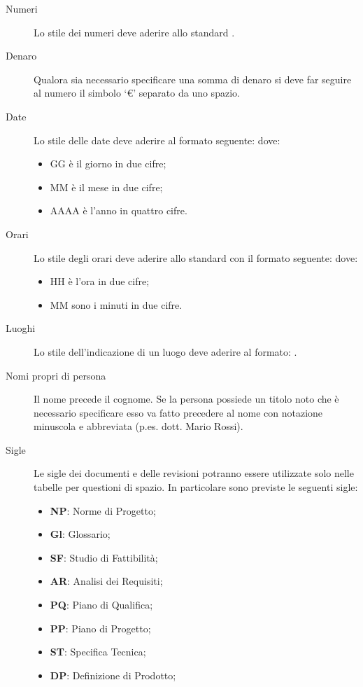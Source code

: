 \documentclass[a4paper, titlepage]{article}
\begin{document}
\begin{description}
	\item[Numeri] 
	Lo stile dei numeri deve aderire allo standard .
	\item[Denaro] 
	Qualora sia necessario specificare una somma di denaro si deve far seguire al numero il simbolo `\euro' separato da uno spazio.
	\item[Date] 
	Lo stile delle date deve aderire al formato seguente:
	dove:
	\begin{itemize}
		\item GG è il giorno in due cifre;
		\item MM è il mese in due cifre;
		\item AAAA è l'anno in quattro cifre.
	\end{itemize}
	\item[Orari] 
	Lo stile degli orari deve aderire allo standard  con il formato seguente:
	dove:
	\begin{itemize}
		\item HH è l'ora in due cifre;
		\item MM sono i minuti in due cifre.
	\end{itemize}
	\item[Luoghi] 
	Lo stile dell'indicazione di un luogo deve aderire al formato:
	.
	\item[Nomi propri di persona] 
	Il nome precede il cognome. Se la persona possiede un titolo noto che è necessario specificare esso va fatto precedere al nome con notazione minuscola e abbreviata (p.es. dott. Mario Rossi).
	\item[Sigle] 
	Le sigle dei documenti e delle revisioni potranno essere utilizzate solo nelle tabelle per questioni di spazio. In particolare sono previste le seguenti sigle:
	\begin{itemize}
		\item \textbf{NP}: Norme di Progetto;
		\item \textbf{Gl}: Glossario;
		\item \textbf{SF}: Studio di Fattibilità;
		\item \textbf{AR}: Analisi dei Requisiti;
		\item \textbf{PQ}: Piano di Qualifica;
		\item \textbf{PP}: Piano di Progetto;
		\item \textbf{ST}: Specifica Tecnica;
		\item \textbf{DP}: Definizione di Prodotto;

\end{itemize}
\end{description}
\end{document}
